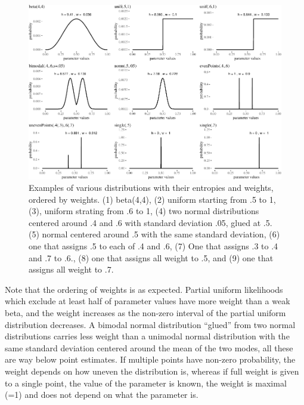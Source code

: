 \documentclass[
  10pt,
  dvipsnames,enabledeprecatedfontcommands]{scrartcl}
\begin{document}
\begin{figure}[H]

\begin{center}\includegraphics[width=1\linewidth]{imprecision_weight_files/figure-latex/fig:weightsWeird-1} \end{center}
\caption{Examples of various distributions with their entropies and weights, ordered by weights. (1) beta(4,4), (2) uniform starting from .5 to 1, (3), uniform strating from .6 to 1, (4) two normal distributions centered around .4 and .6 with standard deviation .05, glued at .5. (5) normal centered around .5 with the same standard deviation, (6) one that assigns .5 to each of .4  and .6, (7) One that assigns .3 to .4 and .7 to .6., (8) one that assigns all weight to .5, and (9) one that assigns all weight to .7.}

\label{fig:weightsWeird}
\end{figure}

Note that the ordering of weights is as expected. Partial uniform
likelihoods which exclude at least half of parameter values have more
weight than a weak beta, and the weight increases as the non-zero
interval of the partial uniform distribution decreases. A bimodal normal
distribution ``glued'' from two normal distributions carries less weight
than a unimodal normal distribution with the same standard deviation
centered around the mean of the two modes, all these are way below point
estimates. If multiple points have non-zero probability, the weight
depends on how uneven the distribution is, whereas if full weight is
given to a single point, the value of the parameter is known, the weight
is maximal (=1) and does not depend on what the parameter is.
\end{document}

